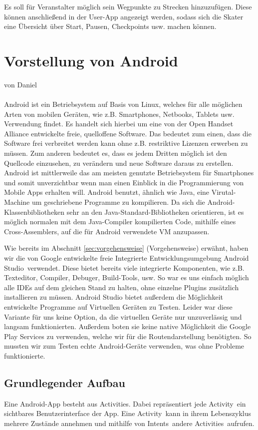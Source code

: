 \documentclass[a4paper, titlepage]{scrartcl}
\newcommand{\AUTHOR}[1]{
	von #1 \\ \\
}
\begin{document}
Es soll für Veranstalter möglich sein Wegpunkte zu Strecken hinzuzufügen. Diese können anschließend in der User-App angezeigt werden, sodass sich die Skater eine Übersicht über Start, Pausen, Checkpoints usw. machen können.


\section{Vorstellung von Android}
\AUTHOR{Daniel}
Android ist ein Betriebsystem auf Basis von Linux, welches für alle möglichen Arten von mobilen Geräten, wie z.B. Smartphones, Netbooks, Tablets usw. Verwendung findet. Es handelt sich hierbei um eine von der Open Handset Alliance entwickelte freie, quelloffene Software. Das bedeutet zum einen, dass die Software frei verbreitet werden kann ohne z.B. restriktive Lizenzen erwerben zu müssen. Zum anderen bedeutet es, dass es jedem Dritten möglich ist den Quellcode einzusehen, zu verändern und neue Software daraus zu erstellen. Android ist mittlerweile das am meisten genutzte Betriebsystem für Smartphones und somit unverzichtbar wenn man einen Einblick in die Programmierung von Mobile Apps erhalten will. Android benutzt, ähnlich wie Java, eine Virutal-Machine um geschriebene Programme zu kompilieren. Da sich die Android-Klassenbibliotheken sehr an den Java-Standard-Bibliotheken orientieren, ist es möglich normalen mit dem Java-Compiler kompilierten Code, mithilfe eines Cross-Assemblers, auf die für Android verwendete VM anzupassen. 

Wie bereits im Abschnitt \ref{sec:vorgehensweise} (Vorgehensweise) erwähnt, haben wir die von Google entwickelte freie Integrierte Entwicklungsumgebung \glqq Android Studio\grqq\ verwendet. Diese bietet bereits viele integrierte Komponenten, wie z.B. Texteditor, Compiler, Debuger, Build-Tools, usw. So war es uns einfach möglich alle IDEs auf dem gleichen Stand zu halten, ohne einzelne Plugins zusätzlich installieren zu müssen. Android Studio bietet außerdem die Möglichkeit entwickelte Programme auf Virtuellen Geräten zu Testen. Leider war diese Variante für uns keine Option, da die virtuellen Geräte nur unzuverlässig und langsam funktionierten. Außerdem boten sie keine native Möglichkeit die Google Play Services zu verwenden, welche wir für die Routendarstellung benötigten. So mussten wir zum Testen echte Android-Geräte verwenden, was ohne Probleme funktionierte.

\subsection{Grundlegender Aufbau}
Eine Android-App besteht aus \glqq Activities\grqq. Dabei repräsentiert jede \glqq Activity\grqq\ ein sichtbares Benutzerinterface der App. Eine \glqq Activity\grqq\ kann in ihrem Lebenszyklus mehrere Zustände annehmen und mithilfe von \glqq Intents\grqq\ andere \glqq Activities\grqq\ aufrufen. 
\end{document}
